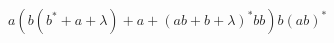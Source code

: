 \documentclass[border=10pt]{standalone}
\begin{document}
$ a(b(b^*+a+\lambda)+a+(ab+b+\lambda)^*bb)b(ab)^* $
\end{document}
